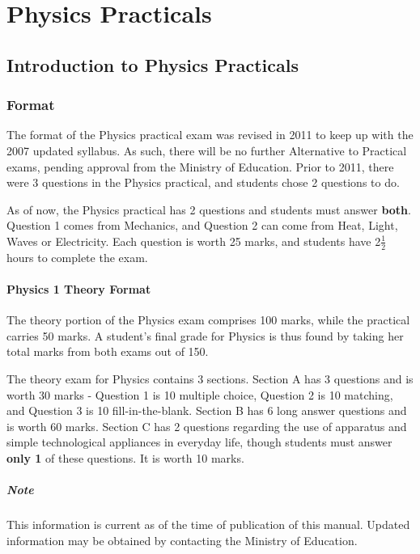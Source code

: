 \chapter{Physics Practicals}

\section{Introduction to Physics Practicals}

\subsection{Format}
The format of the Physics practical exam was revised in 2011 to keep up with the 2007 updated syllabus. As such, there will be no further Alternative to Practical exams, pending approval from the Ministry of Education. Prior to 2011, there were 3 questions in the Physics practical, and students chose 2 questions to do.

As of now, the Physics practical has 2 questions and students must answer \textbf{both}. Question 1 comes from Mechanics, and Question 2 can come from Heat, Light, Waves or Electricity. Each question is worth 25 marks, and students have 2$\frac{1}{2}$ hours to complete the exam.

\subsubsection{Physics 1 Theory Format}
The theory portion of the Physics exam comprises 100 marks, while the practical carries 50 marks. A student's final grade for Physics is thus found by taking her total marks from both exams out of 150.

The theory exam for Physics contains 3 sections. Section A has 3 questions and is worth 30 marks - Question 1 is 10 multiple choice, Question 2 is 10 matching, and Question 3 is 10 fill-in-the-blank. Section B has 6 long answer questions and is worth 60 marks. Section C has 2 questions regarding the use of apparatus and simple technological appliances in everyday life, though students must answer \textbf{only 1} of these questions. It is worth 10 marks.

\paragraph{Note} This information is current as of the time of publication of this manual. Updated information may be obtained by contacting the Ministry of Education. 

